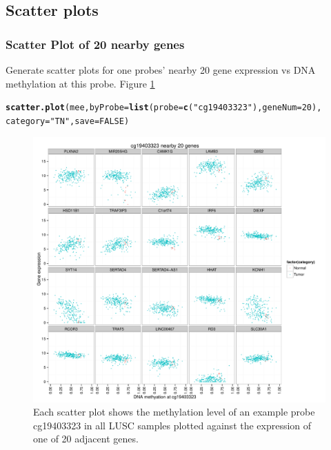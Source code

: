 \documentclass{article}\usepackage[]{graphicx}\usepackage[]{color}
\makeatletter
\def\maxwidth{ %
  \ifdim\Gin@nat@width>\linewidth
    \linewidth
  \else
    \Gin@nat@width
  \fi
}
\newcommand{\hlnum}[1]{\textcolor[rgb]{0.686,0.059,0.569}{#1}}%
\newcommand{\hlstr}[1]{\textcolor[rgb]{0.192,0.494,0.8}{#1}}%
\newcommand{\hlstd}[1]{\textcolor[rgb]{0.345,0.345,0.345}{#1}}%
\newcommand{\hlkwc}[1]{\textcolor[rgb]{0.333,0.667,0.333}{#1}}%
\newcommand{\hlkwd}[1]{\textcolor[rgb]{0.737,0.353,0.396}{\textbf{#1}}}%
\newenvironment{kframe}{%
 \def\at@end@of@kframe{}%
 \ifinner\ifhmode%
  \def\at@end@of@kframe{\end{minipage}}%
  \begin{minipage}{\columnwidth}%
 \fi\fi%
 \def\FrameCommand##1{\hskip\@totalleftmargin \hskip-\fboxsep
 \colorbox{shadecolor}{##1}\hskip-\fboxsep
     \hskip-\linewidth \hskip-\@totalleftmargin \hskip\columnwidth}%
 \MakeFramed {\advance\hsize-\width
   \@totalleftmargin\z@ \linewidth\hsize
   \@setminipage}}%
 {\par\unskip\endMakeFramed%
 \at@end@of@kframe}
\newenvironment{knitrout}{}{} %
\makeatother
\begin{document}
\subsection{Scatter plots}
\subsubsection{Scatter Plot of 20 nearby genes}
Generate scatter plots for one probes' nearby 20 gene expression vs DNA methylation at this probe. Figure \ref{fig:figure1}

\begin{knitrout}
\color{fgcolor}\begin{kframe}
\begin{alltt}
\hlkwd{scatter.plot}\hlstd{(mee,}\hlkwc{byProbe}\hlstd{=}\hlkwd{list}\hlstd{(}\hlkwc{probe}\hlstd{=}\hlkwd{c}\hlstd{(}\hlstr{"cg19403323"}\hlstd{),} \hlkwc{geneNum}\hlstd{=}\hlnum{20}\hlstd{),}
             \hlkwc{category}\hlstd{=}\hlstr{"TN"}\hlstd{,} \hlkwc{save}\hlstd{=}\hlnum{FALSE}\hlstd{)}
\end{alltt}


{\ttfamily\noindent\itshape\color{messagecolor}{\#\# cg19403323}}\end{kframe}\begin{figure}
\includegraphics[width=\maxwidth]{figure/figure1-1} \caption[Scatter Plot of 20 nearby genes]{\label{fig:cg19403323.byprobe} Each scatter plot shows the methylation level of an example probe cg19403323 in all LUSC samples plotted against the expression of one of 20 adjacent genes.}\label{fig:figure1}
\end{figure}


\end{knitrout}
\end{document}
